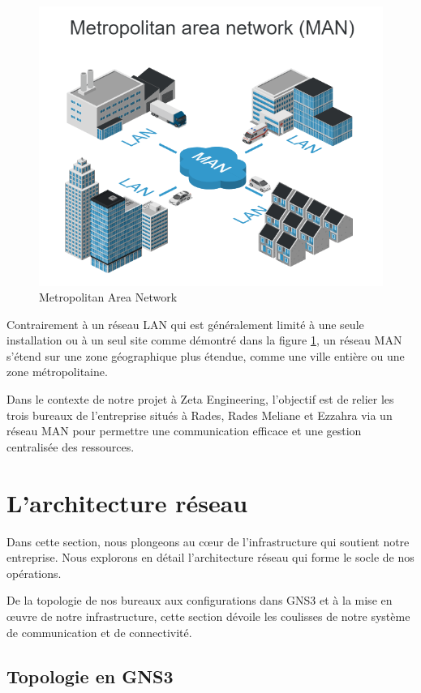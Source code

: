 \begin{figure}[H]
 \centering
    \includegraphics[width=15cm]{Images/network-man1.png}
    \caption{Metropolitan Area Network}
    \label{Chap2.3.1}
\end{figure}  

Contrairement à un réseau LAN qui est généralement limité à une seule installation ou à un seul site comme démontré dans la figure \ref{Chap2.3.1}, un réseau MAN s'étend sur une zone géographique plus étendue, comme une ville entière ou une zone métropolitaine. 


Dans le contexte de notre projet à Zeta Engineering, l'objectif est de relier les trois bureaux de l'entreprise situés à Rades, Rades Meliane et Ezzahra via un réseau MAN pour permettre une communication efficace et une gestion centralisée des ressources. 

\section{L'architecture réseau}

Dans cette section, nous plongeons au cœur de l'infrastructure qui soutient notre entreprise. Nous explorons en détail l'architecture réseau qui forme le socle de nos opérations. 

De la topologie de nos bureaux aux configurations dans GNS3 et à la mise en œuvre de notre infrastructure, cette section dévoile les coulisses de notre système de communication et de connectivité.


\subsection{Topologie en GNS3}


